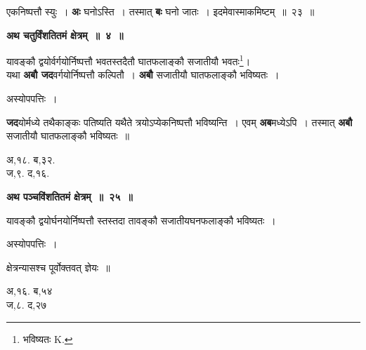 \documentclass[11pt, openany]{book}
\begin{document}
\noindent एकनिष्पत्तौ स्युः~। \textbf{अः} घनोऽस्ति~। तस्मात् \textbf{बः} घनो जातः~। इदमेवास्माकमिष्टम्~॥~२३~॥ 
\vspace{2mm}

\begin{center}
\textbf{\large अथ चतुर्विंशतितमं क्षेत्रम्~॥~४~॥}
\end{center}

{\ab यावङ्कौ द्वयोर्वर्गयोर्निष्पत्तौ भवतस्तदैतौ घातफलाङ्कौ सजातीयौ भवतः\renewcommand{\thefootnote}{१}\footnote{भविष्यतः {\en K.}}\;। }\\

यथा \textbf{अबौ जद}वर्गयोर्निष्पत्तौ कल्पितौ~। \textbf{अबौ} सजातीयौ घातफलाङ्कौ भविष्यतः~। 

\begin{center}
अस्योपपत्तिः~। 
\end{center}

\begin{flushleft}
\begin{minipage}[t]{0.65\textwidth}
\hspace{4mm} \textbf{जद}योर्मध्ये तथैकाङ्कः पतिष्यति यथैते त्रयोऽप्येकनिष्पत्तौ भविष्यन्ति~। एवम्  \textbf{अब}मध्येऽपि~। तस्मात् \textbf{अबौ} सजातीयौ घातफलाङ्कौ भविष्यतः~॥
\end{minipage} 
\hfill
\begin{minipage}[t]{0.25\textwidth}
अ,१८. ब,३२.\\
ज,९. द,१६.
\end{minipage}
\end{flushleft}
\vspace{-1mm}

\begin{center}
\textbf{\large अथ पञ्चविंशतितमं क्षेत्रम्~॥~२५~॥}
\end{center}

{\ab यावङ्कौ द्वयोर्घनयोर्निष्पत्तौ स्तस्तदा तावङ्कौ सजातीयघनफलाङ्कौ भविष्यतः~। }
\vspace{-1mm}

\begin{center}
अस्योपपत्तिः~। 
\end{center}
\vspace{-3mm}

\begin{flushleft}
\begin{minipage}[t]{0.65\textwidth}
\hspace{4mm} क्षेत्रन्यासश्च पूर्वोक्तवत् ज्ञेयः~॥
\end{minipage} 
\hfill
\begin{minipage}[t]{0.25\textwidth}
\vspace{-6mm}

अ,१६. ब,५४ \\
ज,८. द,२७ 
\end{minipage}
\end{flushleft}
\end{document}
